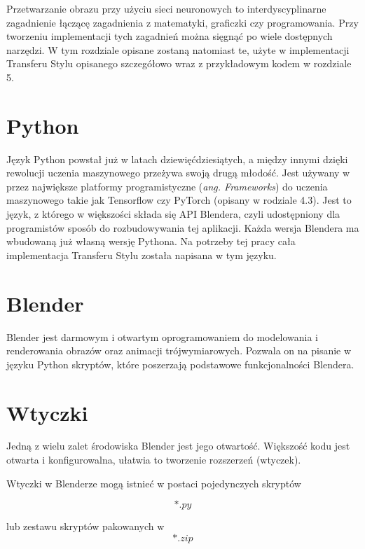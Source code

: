 \documentclass[brudnopis]{xmgr}
\begin{document}
Przetwarzanie obrazu przy użyciu sieci neuronowych to interdyscyplinarne zagadnienie łączącę zagadnienia z matematyki, graficzki czy programowania. Przy tworzeniu implementacji tych zagadnień można sięgnąć po wiele dostępnych narzędzi. W tym rozdziale opisane zostaną natomiast te, użyte w implementacji Transferu Stylu opisanego szczegółowo wraz z przykładowym kodem w rozdziale 5.

\section{Python\label{s:dsssl}}

Język Python powstał już w latach dziewięćdziesiątych, a między innymi dzięki rewolucji uczenia maszynowego przeżywa swoją drugą młodość. Jest używany w przez największe platformy programistyczne (\textit{ang. Frameworks}) do uczenia maszynowego takie jak Tensorflow czy PyTorch (opisany w rodziale 4.3).
Jest to język, z którego w większości składa się API Blendera, czyli udostępniony dla programistów sposób do rozbudowywania tej aplikacji. Każda wersja Blendera ma wbudowaną już własną wersję Pythona. Na potrzeby tej pracy cała implementacja Transferu Stylu została napisana w tym języku.

\section{Blender\label{s:dsssl}}

Blender jest darmowym i otwartym oprogramowaniem do modelowania i renderowania obrazów oraz animacji trójwymiarowych. Pozwala on na pisanie w języku Python skryptów, które poszerzają podstawowe funkcjonalności Blendera.

\section{Wtyczki\label{s:dsssl}}

Jedną z wielu zalet środowiska Blender jest jego otwartość. Większość kodu jest otwarta i konfigurowalna, ułatwia to tworzenie rozszerzeń (wtyczek).

Wtyczki w Blenderze mogą istnieć w postaci pojedynczych skryptów 

\begin{equation}
*.py
\end{equation}

lub zestawu skryptów pakowanych w 
\begin{equation}
*.zip
\end{equation}
\end{document}
